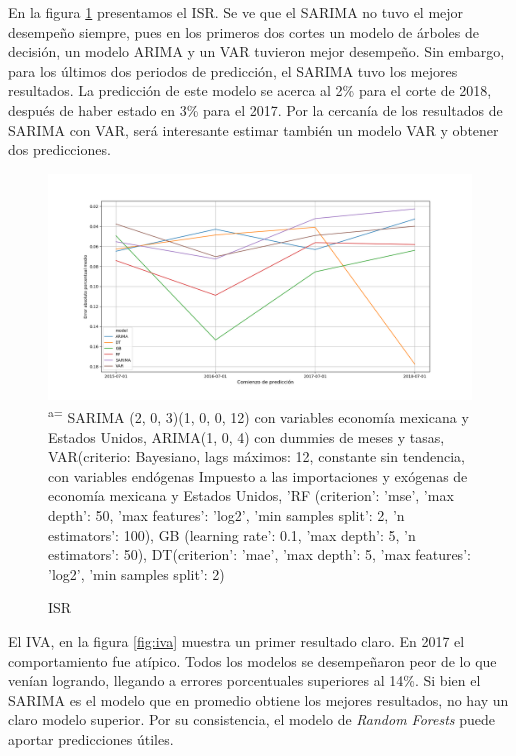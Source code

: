 \documentclass[a4paper, 11pt]{article}
\begin{document}
En la figura \ref{fig:isr} presentamos el ISR. Se ve que el SARIMA no tuvo el mejor desempeño siempre, pues en los primeros dos cortes un modelo de árboles de decisión, un modelo ARIMA y un VAR tuvieron mejor desempeño. Sin embargo, para los últimos dos periodos de predicción, el SARIMA tuvo los mejores resultados. La predicción de este modelo se acerca al 2\% para el corte de 2018, después de haber estado en 3\% para el 2017. Por la cercanía de los resultados de SARIMA con VAR, será interesante estimar también un modelo VAR  y obtener dos predicciones.

\begin{figure}[hbt!]
    \centering
     \caption{ISR}
     \label{fig:isr}
     \includegraphics[scale = 0.4]{figures/isr_neto_(mdp)_r_prec_cierre}
      \small\textsuperscript{a=} SARIMA (2, 0, 3)(1, 0, 0, 12) con variables economía mexicana y Estados Unidos, ARIMA(1, 0, 4) con dummies de meses y tasas, VAR(criterio: Bayesiano, lags máximos: 12, constante sin tendencia, con variables endógenas Impuesto a las importaciones y exógenas de economía mexicana y Estados Unidos,  'RF (criterion': 'mse', 'max depth': 50, 'max features': 'log2', 'min samples split': 2, 'n estimators': 100), GB (learning rate': 0.1, 'max depth': 5, 'n estimators': 50),  DT(criterion': 'mae', 'max depth': 5, 'max features': 'log2', 'min samples split': 2)
\end{figure}

El IVA, en la figura  \ref{fig:iva} muestra un primer resultado claro. En 2017 el comportamiento fue atípico. Todos los modelos se desempeñaron peor de lo que venían logrando, llegando a errores porcentuales superiores al 14\%. Si bien el SARIMA es el modelo que en promedio obtiene los mejores resultados, no hay un claro modelo superior. Por su consistencia, el modelo de \textit{Random Forests} puede aportar predicciones útiles.\\
\end{document}
